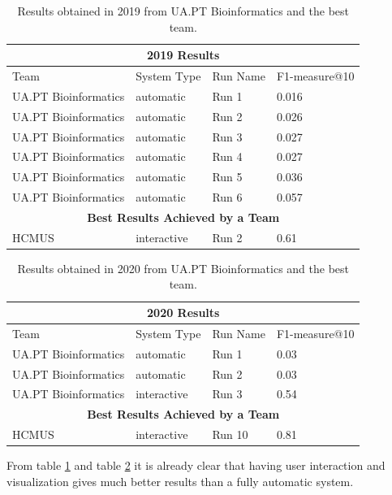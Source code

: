     \begin{table}[htb]
        
        \centering
    \begin{tabular}{ |p{4cm}|p{2.5cm}|p{2cm}|p{3cm}|  }
        \hline
        \multicolumn{4}{|c|}{\textbf{2019 Results}} \\
        \hline
        Team & System Type & Run Name & F1-measure@10 \\
        \hline
        UA.PT Bioinformatics  & automatic  & Run 1   &  0.016 \\
        UA.PT Bioinformatics  & automatic  & Run 2   &  0.026 \\
        UA.PT Bioinformatics  & automatic  & Run 3   &  0.027 \\
        UA.PT Bioinformatics  & automatic  & Run 4   &  0.027 \\
        UA.PT Bioinformatics  & automatic  & Run 5   &  0.036 \\
        UA.PT Bioinformatics  & automatic  & Run 6   &  0.057 \\
        \hline
        \multicolumn{4}{|c|}{\textbf{Best Results Achieved by a Team}} \\
        \hline
        HCMUS  & interactive  & Run 2   &  0.61 \\
        \hline        
        \end{tabular}
        \caption{Results obtained in 2019 from UA.PT Bioinformatics and the best team. }
        \label{table:2019}
    \end{table}
    \begin{table}[htb]
        \centering
    \begin{tabular}{ |p{4cm}|p{2.5cm}|p{2cm}|p{3cm}|  }   
        \hline
        \multicolumn{4}{|c|}{\textbf{2020 Results}} \\
        \hline
        Team & System Type & Run Name & F1-measure@10 \\
        \hline
        UA.PT Bioinformatics  & automatic  & Run 1   &  0.03 \\
        UA.PT Bioinformatics  & automatic  & Run 2   &  0.03 \\
        UA.PT Bioinformatics  & interactive  & Run 3  &  0.54 \\
        \hline
        \multicolumn{4}{|c|}{\textbf{Best Results Achieved by a Team}} \\
        \hline
        HCMUS  & interactive  & Run 10   &  0.81\\
        \hline       
        \end{tabular}
        \caption{Results obtained in 2020 from UA.PT Bioinformatics and the best team.}
        \label{table:2020}
    \end{table}

    From table \ref{table:2019} and table \ref{table:2020} it is already clear that having user interaction and visualization gives much better results than a fully automatic system.